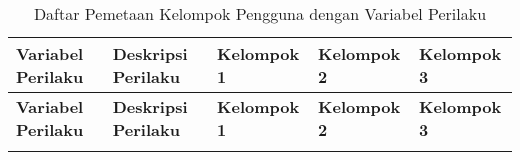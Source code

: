 \RaggedLeft
\begin{footnotesize}
\begin{longtable}[c]{|>{\ccnormspacing}m{}|>{\ccnormspacing}m{}|>{\ccnormspacingcenter}m{}|>{\ccnormspacingcenter}m{}|>{\ccnormspacingcenter}m{}|}
  \caption{Daftar Pemetaan Kelompok Pengguna dengan Variabel Perilaku}
  \label{tab:pemetaan_perilaku} \\
  \hline \rowcolor[HTML]{A3E5F5}
  \centering\textbf{Variabel Perilaku} & \centering\textbf{Deskripsi Perilaku} & \textbf{Kelompok 1} & \textbf{Kelompok 2} & \textbf{Kelompok 3} \\ \hline \endfirsthead
  \hline \rowcolor[HTML]{A3E5F5}
  \centering\textbf{Variabel Perilaku} & \centering\textbf{Deskripsi Perilaku} & \textbf{Kelompok 1} & \textbf{Kelompok 2} & \textbf{Kelompok 3} \\ \hline \endhead

  \hline \endfoot


\end{longtable}
\end{footnotesize}
